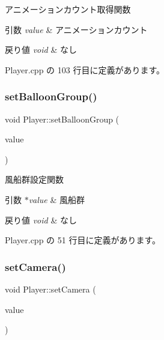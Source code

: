 アニメーションカウント取得関数 


\begin{DoxyParams}{引数}
{\em value} & アニメーションカウント \\
\hline
\end{DoxyParams}

\begin{DoxyRetVals}{戻り値}
{\em void} & なし \\
\hline
\end{DoxyRetVals}


 Player.\+cpp の 103 行目に定義があります。

\mbox{\label{class_player_a9e5527047eded7fdeef45eb94d7d488a}} 
\subsubsection{\texorpdfstring{set\+Balloon\+Group()}{setBalloonGroup()}}
{\footnotesize\ttfamily void Player\+::set\+Balloon\+Group (\begin{DoxyParamCaption}\item[{\mbox{\hyperlink{class_balloon_group}{Balloon\+Group}} $\ast$}]{value }\end{DoxyParamCaption})}



風船群設定関数 


\begin{DoxyParams}{引数}
{\em $\ast$value} & 風船群 \\
\hline
\end{DoxyParams}

\begin{DoxyRetVals}{戻り値}
{\em void} & なし \\
\hline
\end{DoxyRetVals}


 Player.\+cpp の 51 行目に定義があります。

\mbox{\label{class_player_aa8e97731aaa160060e6f9c9784297140}} 
\subsubsection{\texorpdfstring{set\+Camera()}{setCamera()}}
{\footnotesize\ttfamily void Player\+::set\+Camera (\begin{DoxyParamCaption}\item[{\mbox{\hyperlink{class_camera}{Camera}} $\ast$}]{value }\end{DoxyParamCaption})}



